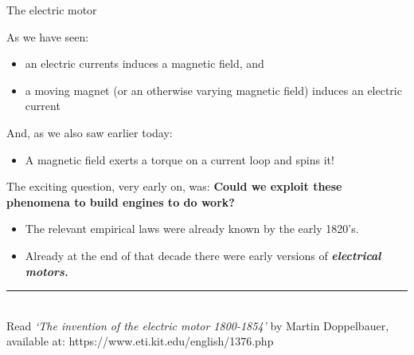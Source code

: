 %
%
%

\begin{frame}{The electric motor}

As we have seen:
\begin{itemize}
  \item an electric currents induces a magnetic field, and
  \item a moving magnet (or an otherwise varying magnetic field) induces an electric current
\end{itemize}

And, as we also saw earlier today:
\begin{itemize}
   \item A magnetic field exerts a torque on a current loop and spins it!
\end{itemize}

\vspace{0.2cm}

The exciting question, very early on, was:
{\bf Could we exploit these phenomena to build engines to do work?}
\begin{itemize}
  \item The relevant empirical laws were already known by the early 1820's.
  \item Already at the end of that decade there were early versions of {\em \bf electrical motors.}
\end{itemize}

\noindent\rule{2cm}{0.4pt}\\
{\scriptsize
Read {\em `The invention of the electric motor 1800-1854' }
by Martin Doppelbauer,
available at: https://www.eti.kit.edu/english/1376.php\\
}

\end{frame}

%
%
%

